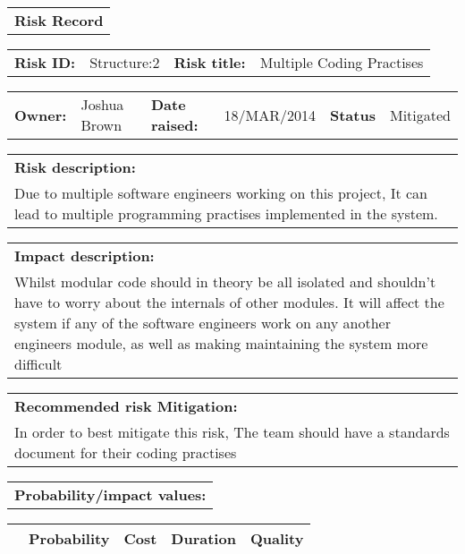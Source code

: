 \begin{table}
	\begin{tabularx}{\textwidth}{| X |}
		\hline
		\textbf{Risk Record} \\
	\end{tabularx}
	\begin{tabularx}{\textwidth}{| l | X | l | X |}
		\hline
		\textbf{Risk ID:} & Structure:2 & \textbf{Risk title:} & Multiple Coding Practises  \\
	\end{tabularx}
	\begin{tabularx}{\textwidth}{| l | X | l | X | l | X |}
		\hline
		\textbf{Owner:} & Joshua Brown & \textbf{Date raised:} & 18/MAR/2014 & \textbf{Status} & Mitigated \\
	\end{tabularx}
	\begin{tabularx}{\textwidth}{| X |}
		\hline
		\textbf{Risk description:} \\ Due to multiple software engineers working on this project, It can lead to multiple programming practises implemented in the system.  \\
	\end{tabularx}
	\begin{tabularx}{\textwidth}{| X |}
		\hline
		\textbf{Impact description:} \\ Whilst modular code should in theory be all isolated and shouldn't have to worry about the internals of other modules. It will affect the system if any of the software engineers work on any another engineers module, as well as making maintaining the system more difficult \\
	\end{tabularx}
	\begin{tabularx}{\textwidth}{| X |}
		\hline
		\textbf{Recommended risk Mitigation:} \\ In order to best mitigate this risk, The team should have a standards document for their coding practises  \\
	\end{tabularx}
	\begin{tabularx}{\textwidth}{| X |}
		\hline
		\textbf{Probability/impact values:} \\
	\end{tabularx}
	\begin{tabularx}{\textwidth}{| l | l | X | X | X |}
		\hline
		 &  \textbf{Probability} & \textbf{Cost} & \textbf{Duration} & \textbf{Quality} \\ \hline

\end{tabularx}
\end{table}
